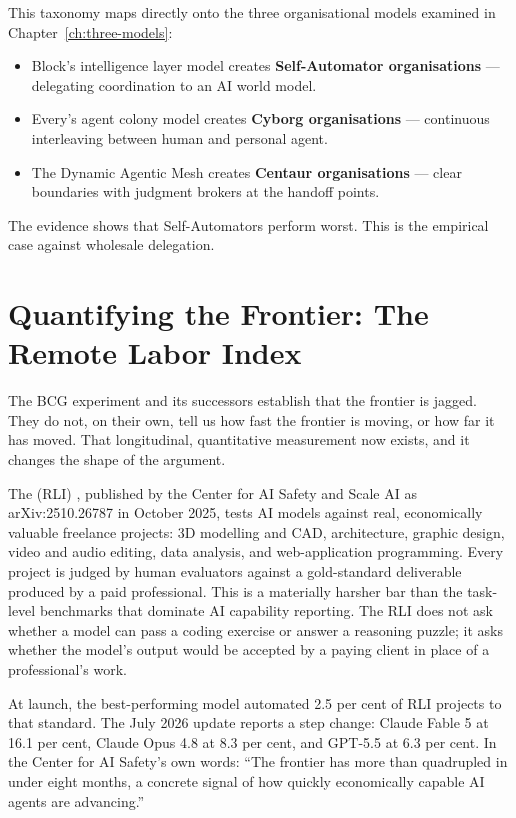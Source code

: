 \begin{keyinsight}[title={The Organisational Design Implication}]
This taxonomy maps directly onto the three organisational models examined in Chapter~\ref{ch:three-models}:
\begin{itemize}
  \item Block's intelligence layer model creates \textbf{Self-Automator organisations} --- delegating coordination to an AI world model.
  \item Every's agent colony model creates \textbf{Cyborg organisations} --- continuous interleaving between human and personal agent.
  \item The Dynamic Agentic Mesh creates \textbf{Centaur organisations} --- clear boundaries with judgment brokers at the handoff points.
\end{itemize}
The evidence shows that Self-Automators perform worst. This is the empirical case against wholesale delegation.
\end{keyinsight}

\section{Quantifying the Frontier: The Remote Labor Index}

The BCG experiment and its successors establish that the frontier is jagged. They do not, on their own, tell us how fast the frontier is moving, or how far it has moved. That longitudinal, quantitative measurement now exists, and it changes the shape of the argument.

The  (RLI) \parencite{RLI2025}, published by the Center for AI Safety and Scale AI as arXiv:2510.26787 in October 2025, tests AI models against real, economically valuable freelance projects: 3D modelling and CAD, architecture, graphic design, video and audio editing, data analysis, and web-application programming. Every project is judged by human evaluators against a gold-standard deliverable produced by a paid professional. This is a materially harsher bar than the task-level benchmarks that dominate AI capability reporting. The RLI does not ask whether a model can pass a coding exercise or answer a reasoning puzzle; it asks whether the model's output would be accepted by a paying client in place of a professional's work.

At launch, the best-performing model automated 2.5 per cent of RLI projects to that standard. The July 2026 update \parencite{CAIS2026RLI} reports a step change: Claude Fable 5 at 16.1 per cent, Claude Opus 4.8 at 8.3 per cent, and GPT-5.5 at 6.3 per cent. In the Center for AI Safety's own words: ``The frontier has more than quadrupled in under eight months, a concrete signal of how quickly economically capable AI agents are advancing.''


